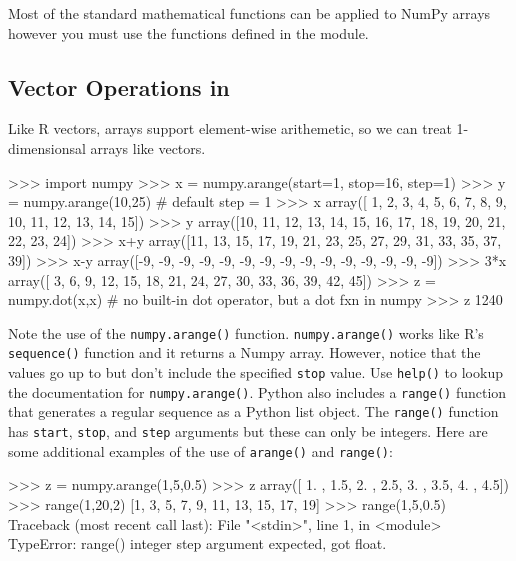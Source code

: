 Most of the standard mathematical functions can be applied to NumPy
arrays however you must use the functions defined in the
\numpy module.
%





\subsection{Vector Operations in \numpy}

Like R vectors, \numpy arrays support element-wise arithemetic, so we can treat 1-dimensionsal \numpy arrays like vectors. 
%
\begin{python}
>>> import numpy
>>> x = numpy.arange(start=1, stop=16, step=1)
>>> y = numpy.arange(10,25) # default step = 1
>>> x
array([ 1,  2,  3,  4,  5,  6,  7,  8,  9, 10, 11, 12, 13, 14, 15])
>>> y
array([10, 11, 12, 13, 14, 15, 16, 17, 18, 19, 20, 21, 22, 23, 24])
>>> x+y
array([11, 13, 15, 17, 19, 21, 23, 25, 27, 29, 31, 33, 35, 37, 39])
>>> x-y
array([-9, -9, -9, -9, -9, -9, -9, -9, -9, -9, -9, -9, -9, -9, -9])
>>> 3*x
array([ 3,  6,  9, 12, 15, 18, 21, 24, 27, 30, 33, 36, 39, 42, 45])
>>> z = numpy.dot(x,x) # no built-in dot operator, but a dot fxn in numpy
>>> z
1240
\end{python}
%
Note the use of the \lstinline!numpy.arange()! function.
\lstinline!numpy.arange()! works like R's \lstinline!sequence()!
function and it returns a Numpy array. However, notice that the values
go up to but don't include the specified \lstinline!stop! value. Use
\lstinline!help()! to lookup the documentation for
\lstinline!numpy.arange()!. Python also includes a \lstinline!range()!
function that generates a regular sequence as a Python list object. The
\lstinline!range()! function has \lstinline!start!, \lstinline!stop!,
and \lstinline!step! arguments but these can only be integers. Here are
some additional examples of the use of \lstinline!arange()! and
\lstinline!range()!:

\begin{python}
>>> z = numpy.arange(1,5,0.5) 
>>> z
array([ 1. ,  1.5,  2. ,  2.5,  3. ,  3.5,  4. ,  4.5])
>>> range(1,20,2)
[1, 3, 5, 7, 9, 11, 13, 15, 17, 19]
>>> range(1,5,0.5)
Traceback (most recent call last):
  File "<stdin>", line 1, in <module>
TypeError: range() integer step argument expected, got float.
\end{python}



